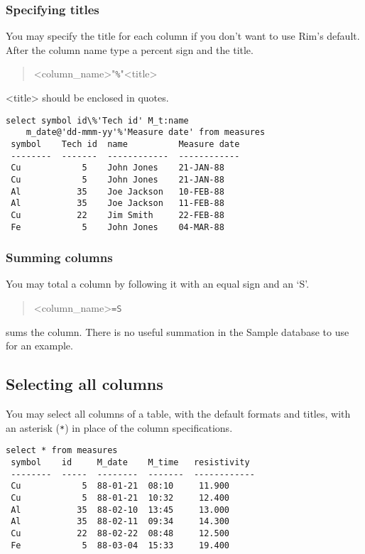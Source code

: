 \documentclass[11pt,a4paper]{report}
\begin{document}
 
\subsubsection{Specifying titles}
You may specify the title for each column if you don't want to use
Rim's default. After the column name type a percent sign and the title.
\begin{verse}
<column\_name>"\verb!%!"<title>
\end{verse}
<title> should be enclosed in quotes.
 
\begin{verbatim}
select symbol id\%'Tech id' M_t:name  
    m_date@'dd-mmm-yy'%'Measure date' from measures
 symbol    Tech id  name          Measure date
 --------  -------  ------------  ------------
 Cu            5    John Jones    21-JAN-88
 Cu            5    John Jones    21-JAN-88
 Al           35    Joe Jackson   10-FEB-88
 Al           35    Joe Jackson   11-FEB-88
 Cu           22    Jim Smith     22-FEB-88
 Fe            5    John Jones    04-MAR-88
\end{verbatim}
 
\subsubsection{Summing columns}
You may total a column by following it with an equal sign and an `S'.
\begin{verse}
<column\_name>\verb!=S!
\end{verse}
sums the column.
There is no useful summation in the Sample database
to use for an example.
 
\subsection{Selecting all columns}
\I{*}
You may select all columns of a table, with the default formats
and titles, with an asterisk (\verb!*!) in place of the column specifications.
\begin{verbatim}
select * from measures
 symbol    id     M_date    M_time   resistivity
 --------  -----  --------  -------  ------------
 Cu            5  88-01-21  08:10     11.900
 Cu            5  88-01-21  10:32     12.400
 Al           35  88-02-10  13:45     13.000
 Al           35  88-02-11  09:34     14.300
 Cu           22  88-02-22  08:48     12.500
 Fe            5  88-03-04  15:33     19.400
\end{verbatim}
 
\end{document}
